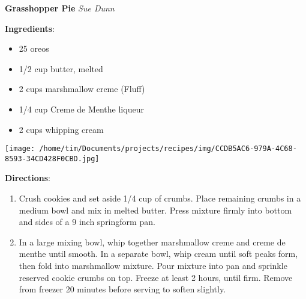 \documentclass[11pt, twoside, openany]{book}
\begin{document}
\noindent\begin{minipage}[t]{\linewidth}%
{\Large\textbf{Grasshopper Pie}} \label{grasshopper-pie}\hfill\textit{Sue Dunn}\\
\noindent\begin{minipage}[t]{0.78\linewidth}%
\textbf{Ingredients}:\vspace{-3mm}
\begin{multicols}{2}
\begin{itemize}\setlength\itemsep{-1mm}
\item 25 oreos
\item 1/2 cup butter, melted
\item 2 cups marshmallow creme (Fluff)
\item 1/4 cup Creme de Menthe liqueur
\item 2 cups whipping cream
\end{itemize}
\end{multicols}
\end{minipage}
\noindent\begin{minipage}[t]{0.18\linewidth}
\centering \strut\vspace*{-\baselineskip}\newline
\texttt{[image: /home/tim/Documents/projects/recipes/img/CCDB5AC6-979A-4C68-8593-34CD428F0CBD.jpg]}\\
\end{minipage}\vspace{3mm}
\textbf{Directions}:
\vspace{-3mm}\begin{enumerate}\setlength\itemsep{-1mm}
\item Crush cookies and set aside 1/4 cup of crumbs. Place remaining crumbs in a medium bowl and mix in melted butter. Press mixture firmly into bottom and sides of a 9 inch springform pan.
\item In a large mixing bowl, whip together marshmallow creme and creme de menthe until smooth. In a separate bowl, whip cream until soft peaks form, then fold into marshmallow mixture. Pour mixture into pan and sprinkle reserved cookie crumbs on top. Freeze at least 2 hours, until firm. Remove from freezer 20 minutes before serving to soften slightly.
\end{enumerate}
\end{minipage}\vspace{8mm}
\end{document}

